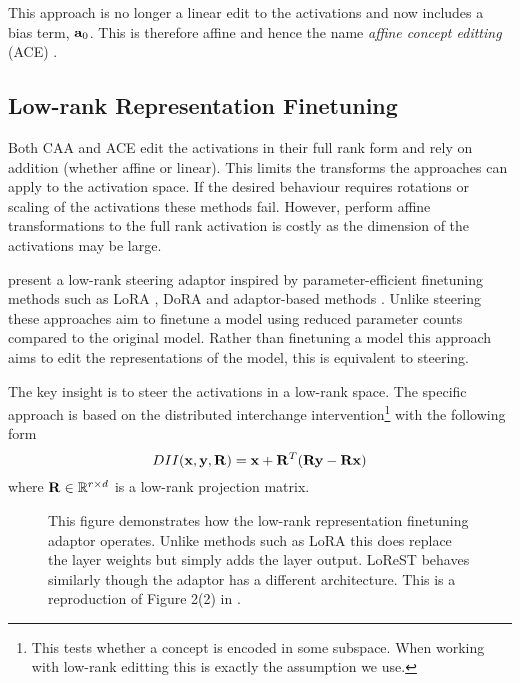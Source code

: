This approach is no longer a linear edit to the activations and now includes a bias term, $\mathbf{a}_0$.
This is therefore affine and hence the name \textit{affine concept editting} (ACE) \citep{ace}.

\subsection{Low-rank Representation Finetuning}
\label{loreft}

Both CAA \citep{caa} and ACE \citep{ace} edit the activations in their full rank form and rely on addition (whether affine or linear).
This limits the transforms the approaches can apply to the activation space.
If the desired behaviour requires rotations or scaling of the activations these methods fail.
However, perform affine transformations to the full rank activation is costly as the dimension of the activations may be large.

\citet{reft} present a low-rank steering adaptor inspired by parameter-efficient finetuning methods such as LoRA \citep{lora}, DoRA \citep{dora} and adaptor-based methods \citep{petl}.
Unlike steering these approaches aim to finetune a model using reduced parameter counts compared to the original model.
Rather than finetuning a model this approach aims to edit the representations of the model, this is equivalent to steering.

The key insight is to steer the activations in a low-rank space.
The specific approach is based on the distributed interchange intervention\footnote{This tests whether a concept is encoded in some subspace. When working with low-rank editting this is exactly the assumption we use.} \citep{dii} with the following form
\begin{equation*}
    DII(\mathbf{x},\mathbf{y},\mathbf{R}) = \mathbf{x} + \mathbf{R}^T(\mathbf{R}\mathbf{y} - \mathbf{R}\mathbf{x})
\end{equation*}
where $\mathbf{R} \in \mathbb{R}^{r\times d}$ is a low-rank projection matrix.

\begin{figure}
    \centering
    \captionsetup{width=.9\textwidth}
    
    \caption{This figure demonstrates how the low-rank representation finetuning adaptor \citep{reft} operates. Unlike methods such as LoRA \citep{lora} this does replace the layer weights but simply adds the layer output. LoReST \citep{steering-clear} behaves similarly though the adaptor has a different architecture. This is a reproduction of Figure 2(2) in \citet{reft}.}
     \label{fig:loreft}
\end{figure}

